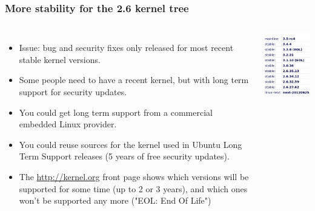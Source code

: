 \begin{frame}
  \frametitle{More stability for the 2.6 kernel tree}
  \begin{columns}
    \begin{itemize}
    \item Issue: bug and security fixes only released for most recent
      stable kernel versions.
    \item Some people need to have a recent kernel, but with long term
      support for security updates.
    \item You could get long term support from a commercial embedded
      Linux provider.
    \item You could reuse sources for the kernel used in Ubuntu Long
      Term Support releases (5 years of free security updates).
    \item The \url{http://kernel.org} front page shows which 
      versions will be supported for some time (up to 2 or 3 years),
      and which ones won't be supported any more ("EOL: End Of Life")
    \end{itemize}
    \includegraphics[width=\textwidth]{slides/sysdev-linux-intro-versioning/stable-kernels.png}
  \end{columns}
\end{frame}

